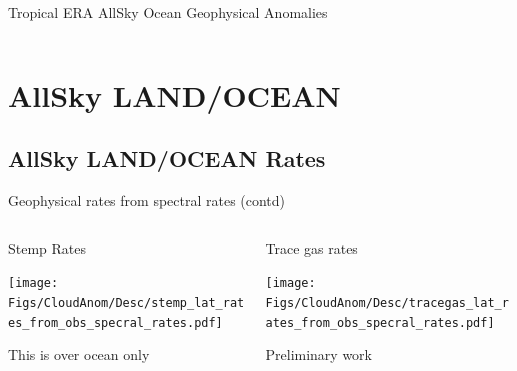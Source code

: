 \documentclass[10pt,t]{beamer}
\begin{document}
\begin{frame}{Tropical ERA AllSky Ocean Geophysical Anomalies}
\begin{columns}
\begin{column}{0.45\columnwidth}

\end{column}
\end{columns}
\end{frame}


\section{AllSky LAND/OCEAN}
\subsection{AllSky LAND/OCEAN Rates}

\begin{frame}{Geophysical rates from spectral rates (contd)}
\vspace{-0.3in}

\begin{columns}
\begin{column}{0.55\columnwidth}
\begin{block}{\footnotesize Stemp Rates}
\vspace{-0.1in}
\begin{center}
\texttt{[image: Figs/CloudAnom/Desc/stemp\_lat\_rates\_from\_obs\_specral\_rates.pdf]}
\end{center}
\footnotesize
This is over ocean only
\end{block}
\end{column}

\begin{column}{0.55\columnwidth}
\begin{block}{\footnotesize Trace gas rates}
\vspace{-0.1in}
\begin{center}
\texttt{[image: Figs/CloudAnom/Desc/tracegas\_lat\_rates\_from\_obs\_specral\_rates.pdf]}
\end{center}
\footnotesize
Preliminary work
\end{block}
\end{column}
\end{columns}
\end{frame}
\end{document}
